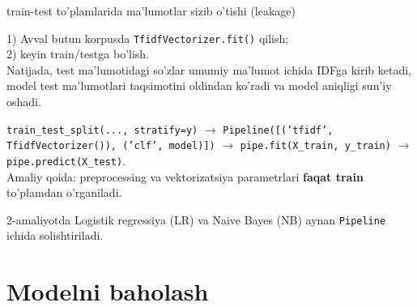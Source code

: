 \documentclass[aspectratio=169,11pt]{beamer}
\begin{document}
\begin{frame}{train-test to'plamlarida ma'lumotlar sizib o'tishi (leakage)}
  \begin{tcolorbox}[warnbox,title=Noto'g'ri tartib]
    \footnotesize
    1) Avval butun korpusda \texttt{TfidfVectorizer.fit()} qilish;\\
    2) keyin train/testga bo'lish.\\[2pt]
    Natijada, test ma'lumotidagi so'zlar umumiy ma'lumot ichida IDFga kirib ketadi, model test ma'lumotlari taqsimotini oldindan ko'radi va model aniqligi sun'iy oshadi.
  \end{tcolorbox}
  \begin{tcolorbox}[okbox,title=To'g'ri tartib]
    \footnotesize
    \texttt{train\_test\_split(..., stratify=y)} $\to$
    \texttt{Pipeline([('tfidf', TfidfVectorizer()), ('clf', model)])} $\to$
    \texttt{pipe.fit(X\_train, y\_train)} $\to$
    \texttt{pipe.predict(X\_test)}.\\[2pt]
    Amaliy qoida: preprocessing va vektorizatsiya parametrlari \textbf{faqat train} to'plamdan o'rganiladi.
  \end{tcolorbox}
  \textcolor{halfgray}{\footnotesize 2-amaliyotda Logistik regressiya (LR) va Naive Bayes (NB) aynan \texttt{Pipeline} ichida solishtiriladi.}
\end{frame}

\section[Metrikalar]{Modelni baholash}
\end{document}
